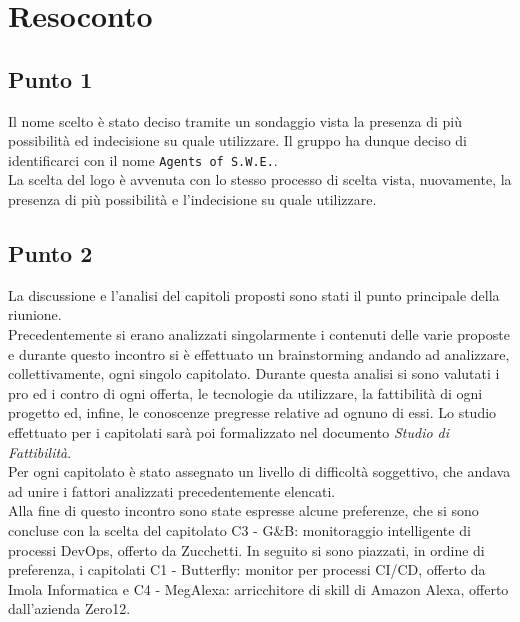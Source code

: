 \section{Resoconto}

\subsection{Punto 1}
Il nome scelto è stato deciso tramite un sondaggio vista la presenza di più possibilità ed indecisione su quale utilizzare. Il gruppo ha dunque deciso di identificarci con il nome \texttt{Agents of S.W.E.}.\\
La scelta del logo è avvenuta con lo stesso processo di scelta vista, nuovamente, la presenza di più possibilità e l'indecisione su quale utilizzare.

\subsection{Punto 2}
La discussione e l'analisi del capitoli proposti sono stati il punto principale della riunione. \\
Precedentemente si erano analizzati singolarmente i contenuti delle varie proposte e durante questo incontro si è effettuato un brainstorming andando ad analizzare, collettivamente, ogni singolo capitolato. Durante questa analisi si sono valutati i pro ed i contro di ogni offerta, le tecnologie da utilizzare, la fattibilità di ogni progetto ed, infine, le conoscenze pregresse relative ad ognuno di essi. Lo studio effettuato per i capitolati sarà poi formalizzato nel documento \textit{Studio di Fattibilità}. \\
Per ogni capitolato è stato assegnato un livello di difficoltà soggettivo, che andava ad unire i fattori analizzati precedentemente elencati.\\
Alla fine di questo incontro sono state espresse alcune preferenze, che si sono concluse con la scelta del capitolato  C3 - G\&B: monitoraggio intelligente di processi DevOps, offerto da Zucchetti. In seguito si sono piazzati, in ordine di preferenza, i capitolati C1 - Butterfly: monitor per processi CI/CD, offerto da Imola Informatica e C4  - MegAlexa: arricchitore di skill di Amazon Alexa, offerto dall'azienda Zero12. 
